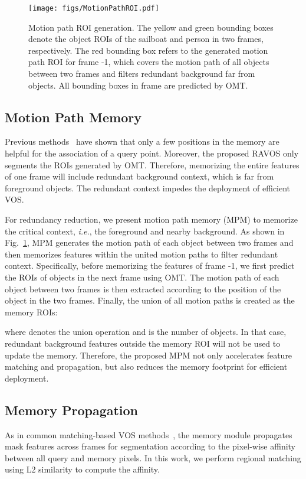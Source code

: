 \documentclass[journal]{IEEEtran}
\def\ie{\emph{i.e.}}
\begin{document}
\begin{figure}[t]
\centering
\texttt{[image: figs/MotionPathROI.pdf]}
\caption{Motion path ROI generation. The yellow and green bounding boxes denote the object ROIs of the sailboat and person in two frames, respectively.
The red bounding box refers to the generated motion path ROI for frame -1, which covers the motion path of all objects between two frames and filters redundant background far from objects. All bounding boxes in frame  are predicted by OMT.}
\label{fig:memory}
\end{figure}






\subsection{Motion Path Memory}
Previous methods~\cite{STCN,MAMP} have shown that only a few positions in the memory are helpful for the association of a query point. Moreover, the proposed RAVOS only segments the ROIs generated by OMT. Therefore, memorizing the entire features of one frame will include redundant background context, which is far from foreground objects.
The redundant context impedes the deployment of efficient VOS. 

For redundancy reduction, we present motion path memory (MPM) to memorize the critical context, \ie, the foreground and nearby background. As shown in Fig.~\ref{fig:memory}, MPM generates the motion path of each object between two frames and then memorizes features within the united motion paths to filter redundant context. Specifically, before memorizing the features of frame -1, we first predict the ROIs of objects  in the next frame  using OMT. The motion path of each object between two frames is then extracted according to the position of the object in the two frames. Finally, the union of all motion paths is created as the memory ROIs:

where  denotes the union operation and  is the number of objects. In that case, redundant background features outside the memory ROI will not be used to update the memory. Therefore, the proposed MPM not only accelerates feature matching and propagation, but also reduces the memory footprint for efficient deployment.



\subsection{Memory Propagation}
As in common matching-based VOS methods~\cite{STM,STCN}, the memory module propagates mask features across frames for segmentation according to the pixel-wise affinity between all query and memory pixels. In this work, we perform regional matching using L2 similarity to compute the affinity. 
\end{document}
